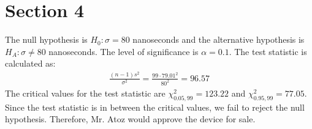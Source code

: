 \documentclass{article}
\begin{document}
\section{Section 4}

The null hypothesis is $H_0: \sigma = 80$ nanoseconds and the alternative hypothesis is $H_A: \sigma \neq 80$ nanoseconds. The level of significance is $\alpha = 0.1$. The test statistic is calculated as:
\begin{align*}
    \frac{(n-1)s^2}{\sigma^2} = \frac{99 \cdot 79.01^2}{80^2} = 96.57
\end{align*}
The critical values for the test statistic are $\chi^2_{0.05, 99} = 123.22$ and $\chi^2_{0.95, 99} = 77.05$. Since the test statistic is in between the critical values, we fail to reject the null hypothesis. Therefore, Mr. Atoz would approve the device for sale.
\end{document}

